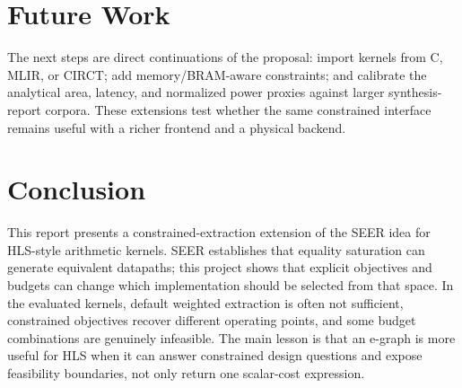 \documentclass[sigplan,10pt,review]{acmart}
\begin{document}
\section{Future Work}
The next steps are direct continuations of the proposal: import kernels from C, MLIR, or CIRCT; add memory/BRAM-aware constraints; and calibrate the analytical area, latency, and normalized power proxies against larger synthesis-report corpora. These extensions test whether the same constrained interface remains useful with a richer frontend and a physical backend.

\section{Conclusion}
This report presents a constrained-extraction extension of the SEER idea for HLS-style arithmetic kernels. SEER establishes that equality saturation can generate equivalent datapaths; this project shows that explicit objectives and budgets can change which implementation should be selected from that space. In the evaluated kernels, default weighted extraction is often not sufficient, constrained objectives recover different operating points, and some budget combinations are genuinely infeasible. The main lesson is that an e-graph is more useful for HLS when it can answer constrained design questions and expose feasibility boundaries, not only return one scalar-cost expression.


\clearpage


\end{document}
